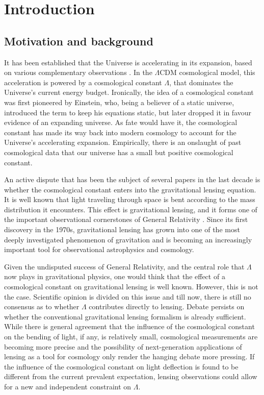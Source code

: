 \chapter{Introduction}


\section{Motivation and background}

It has been established that the Universe is accelerating in its expansion, based on various complementary observations \citep{riess2004type,spergel2003first}. In the $\Lambda \text{CDM}$ cosmological model, this acceleration is powered by a cosmological constant $\Lambda$, that dominates the Universe's current energy budget. Ironically, the idea of a cosmological constant was first pioneered by Einstein, who, being a believer of a static universe, introduced the term to keep his equations static, but later dropped it in favour evidence of an expanding universe. As fate would have it, the cosmological constant has made its way back into modern cosmology to account for the Universe's accelerating expansion. Empirically, there is an onslaught of past cosmological data \citet{carmeli2001value,de2000flat,peebles2003cosmological} that our universe has a small but positive cosmological constant. 

An active dispute that has been the subject of several papers in the last decade is whether the cosmological constant enters into the gravitational lensing equation. It is well known that light traveling through space is bent according to the mass distribution it encounters. This effect is gravitational lensing, and it forms one of the important observational cornerstones of General Relativity \citep{will1993theory}. Since its first discovery in the 1970s, gravitational lensing has grown into one of the most deeply investigated phenomenon of gravitation and is becoming an increasingly important tool for observational astrophysics and cosmology. 

Given the undisputed success of General Relativity, and the central role that $\Lambda$ now plays in gravitational physics, one would think that the effect of a cosmological constant on gravitational lensing is well known. However, this is not the case. Scientific opinion is divided on this issue and till now, there is still no consensus as to whether $\Lambda$ contributes directly to lensing. Debate persists on whether the conventional gravitational lensing formalism is already sufficient. While there is general agreement that the influence of the cosmological constant on the bending of light, if any, is relatively small, cosmological measurements are becoming more precise and the possibility of next-generation applications of lensing as a tool for cosmology only render the hanging debate more pressing. If the influence of the cosmological constant on light deflection is found to be different from the current prevalent expectation, lensing observations could allow for a new and independent constraint on $\Lambda$. 

